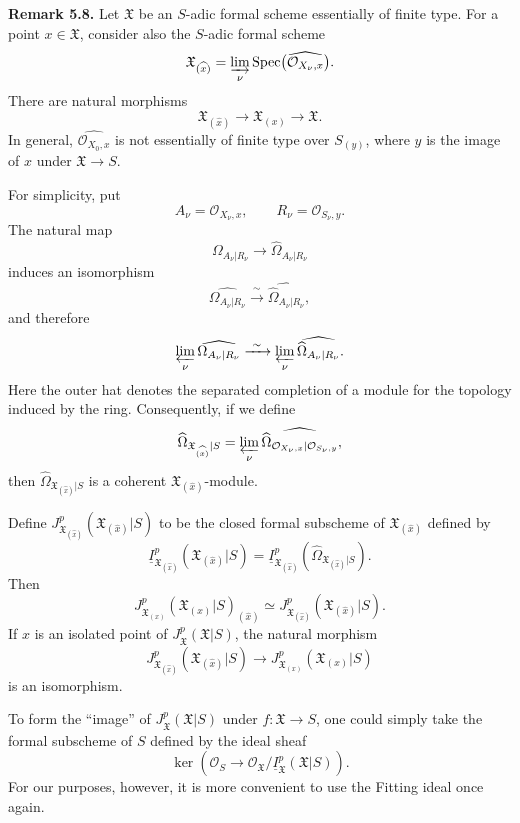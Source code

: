 \medskip
\noindent\textbf{Remark 5.8.}
Let $\mathfrak X$ be an $S$-adic formal scheme essentially of finite
type. For a point $x\in\mathfrak X$, consider also the $S$-adic
formal scheme
\[
\mathfrak X_{(\widehat{x})}
=\varinjlim_\nu
 \operatorname{Spec}\bigl(\widehat{\mathcal O_{X_\nu,x}}\bigr).
\]
There are natural morphisms
\[
\mathfrak X_{(\widehat{x})}
\longrightarrow\mathfrak X_{(x)}
\longrightarrow\mathfrak X.
\]
In general, $\widehat{\mathcal O_{X_0,x}}$ is not essentially of
finite type over $S_{(y)}$, where $y$ is the image of $x$ under
$\mathfrak X\longrightarrow S$.

For simplicity, put
\[
A_\nu=\mathcal O_{X_\nu,x},
\qquad R_\nu=\mathcal O_{S_\nu,y}.
\]
The natural map
\[
\Omega_{A_\nu|R_\nu}
\longrightarrow\widehat\Omega_{A_\nu|R_\nu}
\]
induces an isomorphism
\[
\widehat{\Omega_{A_\nu|R_\nu}}
\xrightarrow{\ \sim\ }
\widehat{\widehat\Omega_{A_\nu|R_\nu}},
\]
and therefore
\[
\varprojlim_\nu\widehat{\Omega_{A_\nu|R_\nu}}
\xrightarrow{\ \sim\ }
\varprojlim_\nu
 \widehat{\widehat\Omega_{A_\nu|R_\nu}}.
\]
Here the outer hat denotes the separated completion of a module for
the topology induced by the ring. Consequently, if we define
\[
\widehat\Omega_{\mathfrak X_{(\widehat{x})}|S}
=\varprojlim_\nu
 \widehat{\widehat\Omega_{
   \mathcal O_{X_\nu,x}|\mathcal O_{S_\nu,y}}},
\]
then $\widehat\Omega_{\mathfrak X_{(\widehat{x})}|S}$ is a coherent
$\mathfrak X_{(\widehat{x})}$-module.


Define
$J_{\mathfrak X_{(\widehat{x})}}^p
 (\mathfrak X_{(\widehat{x})}|S)$
to be the closed formal subscheme of
$\mathfrak X_{(\widehat{x})}$ defined by
\[
\underline I_{\mathfrak X_{(\widehat{x})}}^p
 (\mathfrak X_{(\widehat{x})}|S)
=\underline I_{\mathfrak X_{(\widehat{x})}}^p
 (\widehat\Omega_{\mathfrak X_{(\widehat{x})}|S}).
\]
Then
\[
J_{\mathfrak X_{(x)}}^p(\mathfrak X_{(x)}|S)_{(\widehat{x})}
\simeq
J_{\mathfrak X_{(\widehat{x})}}^p
 (\mathfrak X_{(\widehat{x})}|S).
\]
If $x$ is an isolated point of
$J_{\mathfrak X}^p(\mathfrak X|S)$, the natural morphism
\[
J_{\mathfrak X_{(\widehat{x})}}^p
 (\mathfrak X_{(\widehat{x})}|S)
\longrightarrow
J_{\mathfrak X_{(x)}}^p(\mathfrak X_{(x)}|S)
\]
is an isomorphism.

To form the ``image'' of $J_{\mathfrak X}^p(\mathfrak X|S)$ under
$f:\mathfrak X\longrightarrow S$, one could simply take the formal
subscheme of $S$ defined by the ideal sheaf
\[
\ker\left(
 \mathcal O_S\longrightarrow
 \mathcal O_{\mathfrak X}/
 \underline I_{\mathfrak X}^p(\mathfrak X|S)
\right).
\]
For our purposes, however, it is more convenient to use the Fitting
ideal once again.
